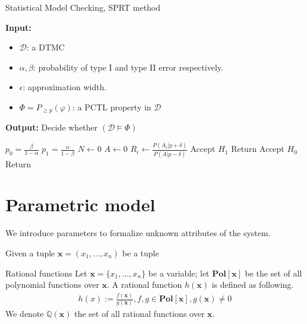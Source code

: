 \begin{algorithm}[H]
    \caption{Statistical Model Checking, SPRT method}
    \label{alg:smc-sprt}
    \hspace*{\algorithmicindent} \textbf{Input:}
    \begin{itemize}
        \item $\mathcal{D}$: a DTMC
        \item $\alpha, \beta$: probability of type I and type II error respectively.
        \item $\epsilon$: approximation width.
        \item $\Phi = P_{\geq p}(\varphi)$: a PCTL property in $\mathcal{D}$
    \end{itemize}
    \hspace*{\algorithmicindent} \textbf{Output:} Decide whether $(\mathcal{D} \models \Phi)$
    \begin{algorithmic}[1]
        \State $p_0 = \frac{\beta}{1 - \alpha}$
        \State $p_1 = \frac{\alpha}{1 - \beta}$
        \State $N \leftarrow 0$
        \State $A \leftarrow 0$
        \State $R_i \leftarrow \frac{P(A_i | p + \delta)}{P(A | p - \delta)}$
        \State Accept $H_1$
        \State Return
        \Else
        \State Accept $H_0$
        \State Return
        \EndIf
        \EndIf
        \EndWhile
        \EndProcedure
    \end{algorithmic}
\end{algorithm}


\section{Parametric model}
We introduce parameters to formalize unknown attributes of the system.
\begin{definition}
    Given a tuple $\mathbf{x}=(x_1,\ldots,x_n)$ be a tuple
\end{definition}

\begin{definition}{Rational functions}
    Let $\mathbf{x}=\{x_1,\ldots,x_n\}$ be a variable; let $\mathbf{Pol}[\mathbf{x}]$ be the set of
    all polynomial functions over $\mathbf{x}$. A rational function $h(\mathbf{x})$ is defined
    as following.
    \begin{align*}
        h(x) := \frac{f(\mathbf{x})}{g(\mathbf{x})}, f,g\in\mathbf{Pol}[\mathbf{x}], g(\mathbf{x}) \neq 0
    \end{align*}
    We denote $\mathbb{Q}(\mathbf{x})$ the set of all rational functions over $\mathbf{x}$.
\end{definition}


